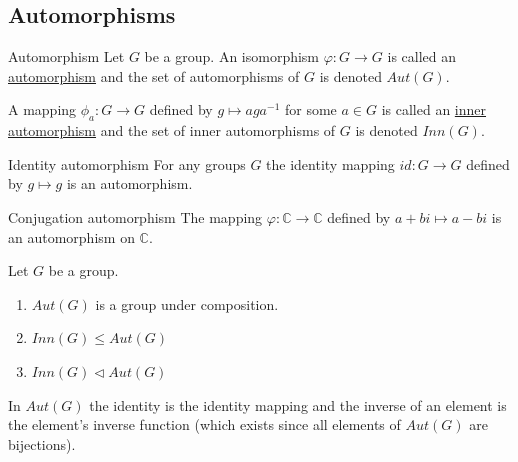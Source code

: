 \documentclass[12pt]{article}
\renewcommand{\C}{\mathbb{C}}
\newcommand{\inv}{^{-1}}
\begin{document}
	\subsection{Automorphisms}
	
	\begin{mydef}{Automorphism}{}
		Let $G$ be a group. An isomorphism $\varphi:G\to G$ is called an \underline{automorphism} and the set of automorphisms of $G$ is denoted $Aut(G)$.
		
		A mapping $\phi_a:G\to G$ defined by $g\mapsto aga\inv$ for some $a\in G$ is called an \underline{inner automorphism} and the set of inner automorphisms of $G$ is denoted $Inn(G)$.
	\end{mydef}
	
	\begin{myex}{Identity automorphism}{}
		For any groups $G$ the identity mapping $id:G\to G$ defined by $g\mapsto g$ is an automorphism.
	\end{myex}
	
	\begin{myex}{Conjugation automorphism}{}
		The mapping $\varphi:\C\to\C$ defined by $a+bi\mapsto a-bi$ is an automorphism on $\C$.
	\end{myex}
	
	\begin{mythm}{}{}
		Let $G$ be a group.
		\begin{enumerate}
			\item $Aut(G)$ is a group under composition.
			\item $Inn(G)\leq Aut(G)$
			\item $Inn(G)\lhd Aut(G)$
		\end{enumerate}
	\end{mythm}
	
	\begin{myrem}{}{}
		In $Aut(G)$ the identity is the identity mapping and the inverse of an element is the element's inverse function (which exists since all elements of $Aut(G)$ are bijections).
	\end{myrem}
	
\end{document}
